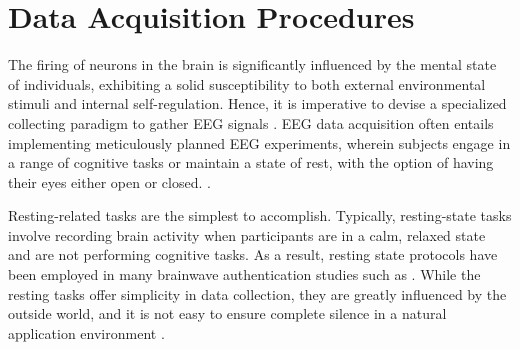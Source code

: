 


\section{Data Acquisition Procedures}
\label{sec:Background:Data Acquisition Procedures}
The firing of neurons in the brain is significantly influenced by the mental state of individuals, exhibiting a solid susceptibility to both external environmental stimuli and internal self-regulation. Hence, it is imperative to devise a specialized collecting paradigm to gather EEG signals \cite{zhang2021review}.
EEG data acquisition often entails implementing meticulously planned EEG experiments, wherein subjects engage in a range of cognitive tasks or maintain a state of rest, with the option of having their eyes either open or closed.  \cite{survey_brain_biometrics}. 
\smallskip

Resting-related tasks are the simplest to accomplish. Typically, resting-state tasks involve recording brain activity when participants are in a calm, relaxed state and are not performing cognitive tasks. 
As a result, resting state protocols have been employed in many brainwave authentication studies such as \cite{nakanishi2009eeg, thomas2018eeg}. While the resting tasks offer simplicity in data collection, they are greatly influenced by the outside world, and it is not easy to ensure complete silence in a natural application environment \cite{zhang2021review}. 
\smallskip

